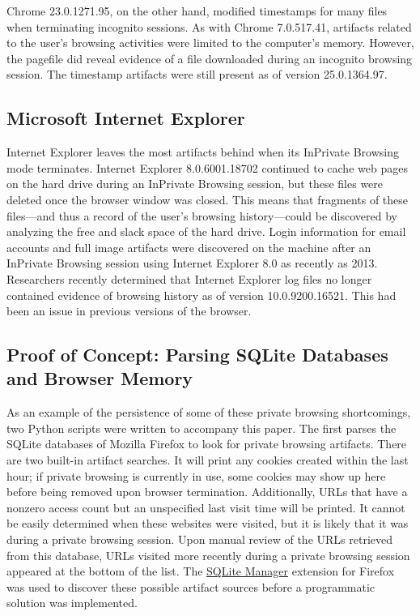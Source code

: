 \documentclass[pdftex,letterpaper,titlepage,12pt]{article}
\begin{document}
    Chrome 23.0.1271.95, on the other hand, modified timestamps for many files
    when terminating incognito sessions. As with Chrome 7.0.517.41, artifacts 
    related to the user's browsing activities were limited to the computer's 
    memory. However, the pagefile did reveal evidence of a file downloaded
    during an incognito browsing session.\cite{ohana13} The timestamp artifacts
    were still present as of version 25.0.1364.97.\cite{satvat13}
    
    \subsection{Microsoft Internet Explorer}
    Internet Explorer leaves the most artifacts behind when its InPrivate
    Browsing mode terminates.\cite{ohana13} Internet Explorer 8.0.6001.18702
    continued to cache web pages on the hard drive during an InPrivate
    Browsing session, but these files were deleted once the browser window was
    closed. This means that fragments of these files---and thus a record of the
    user's browsing history---could be discovered by analyzing the free and
    slack space of the hard drive.\cite{said11} Login information for email
    accounts and full image artifacts were discovered on the machine after an 
    InPrivate Browsing session using Internet Explorer 8.0 as recently as 2013.
    \cite{ohana13} Researchers recently determined that Internet Explorer log 
    files no longer contained evidence of browsing history as of version 
    10.0.9200.16521. This had been an issue in previous versions of the 
    browser.\cite{satvat13}    
	
	\subsection{Proof of Concept: Parsing SQLite Databases and Browser Memory}
	As an example of the persistence of some of these private browsing 
	shortcomings, two Python scripts were written to accompany this paper.
	The first parses the SQLite databases of Mozilla Firefox to look for 
	private browsing artifacts. There are two built-in artifact searches. It 
	will print any cookies created within the last hour; if private browsing is
	currently in use, some cookies may show up here before being removed upon
	browser termination. Additionally, URLs that have a nonzero access count
	but an unspecified last visit time will be printed. It cannot be easily
	determined when these websites were visited, but it is likely that it was
	during a private browsing session. Upon manual review of the URLs retrieved 
	from this database, URLs visited more recently during a private browsing 
	session appeared at the bottom of the list. The 
	\href{https://addons.mozilla.org/en-US/firefox/addon/sqlite-manager}
	{SQLite Manager} extension for Firefox was used to discover these possible
	artifact sources before a programmatic solution was implemented.
	
\end{document}
